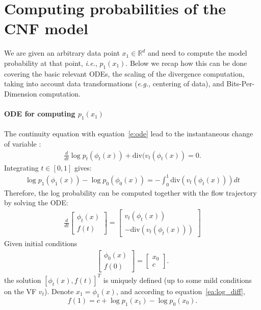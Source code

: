 \documentclass{article}
\makeatletter
\newcommand{\brac}[1]{\left [#1\right ]}
\newcommand{\Real}{\mathbb R}
\newcommand{\divv}{\mathrm{div}} %
\newcommand{\eg}{{e.g.}}
\newcommand{\ie}{{i.e.}}
\def\eqref#1{equation~\ref{#1}}
\renewcommand*{\eg}{{\it e.g.}\@\xspace}
\renewcommand*{\ie}{{\it i.e.}\@\xspace}
\makeatother
\begin{document}
\section{Computing probabilities of the CNF model}
\label{A:cnf_prob}

We are given an arbitrary data point $x_1\in \Real^d$ and need to compute the model probability at that point, \ie, $p_1(x_1)$. Below we recap how this can be done covering the basic relevant ODEs, the scaling of the divergence computation, taking into account data transformations (\eg, centering of data), and Bits-Per-Dimension computation. 

\paragraph{ODE for computing $p_1(x_1)$}
The continuity equation with \eqref{e:ode} lead to the instantaneous change of variable  \citep{chen2018neural,ben2022matching}:
\begin{align*}
    \frac{d}{dt}\log p_t(\phi_t(x)) + \divv (v_t(\phi_t(x))=0.
\end{align*}
Integrating $t\in [0,1]$ gives:
\begin{align}\label{ea:log_diff}
    \log p_1(\phi_1(x)) - \log p_0(\phi_0(x)) = -\int_0^1 \divv(v_t(\phi_t(x))) dt
\end{align}
Therefore, the log probability can be computed together with the flow trajectory by solving the ODE:
\begin{align}\label{ea:system}
    \frac{d}{dt}\begin{bmatrix}
    \phi_t(x) \\
    f(t) 
    \end{bmatrix}=
    \begin{bmatrix}
    v_t(\phi_t(x)) \\ 
    -\divv (v_t(\phi_t(x)))
    \end{bmatrix}
\end{align}
Given initial conditions 
\begin{align}\label{ea:initial_conds}
    \begin{bmatrix}
    \phi_0(x) \\ 
    f(0)
    \end{bmatrix} = \begin{bmatrix}
    x_0 \\ c
    \end{bmatrix}.
\end{align}
the solution $\brac{\phi_t(x),f(t)}^T$ is uniquely defined (up to some mild conditions on the VF $v_t$). Denote $x_1 = \phi_1(x)$, and according to \eqref{ea:log_diff}, 
\begin{equation}\label{ea:f1}
    f(1) = c + \log p_1(x_1) - \log p_0(x_0).
\end{equation}
\end{document}
